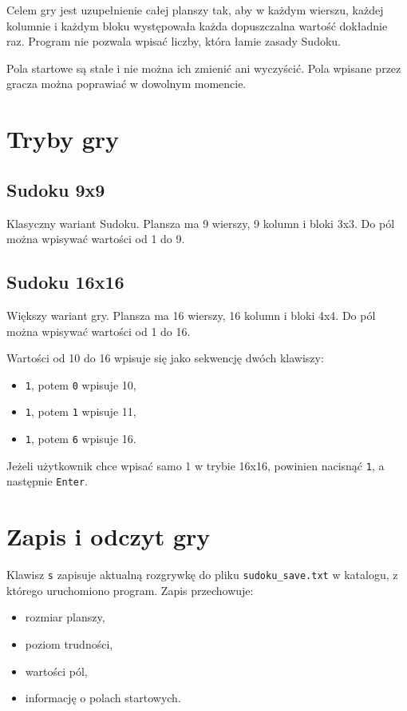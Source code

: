 \documentclass[12pt,a4paper]{article}
\begin{document}
Celem gry jest uzupełnienie całej planszy tak, aby w każdym wierszu, każdej
kolumnie i każdym bloku występowała każda dopuszczalna wartość dokładnie raz.
Program nie pozwala wpisać liczby, która łamie zasady Sudoku.

Pola startowe są stałe i nie można ich zmienić ani wyczyścić. Pola wpisane przez
gracza można poprawiać w dowolnym momencie.

\section{Tryby gry}

\subsection{Sudoku 9x9}

Klasyczny wariant Sudoku. Plansza ma 9 wierszy, 9 kolumn i bloki 3x3. Do pól
można wpisywać wartości od 1 do 9.

\subsection{Sudoku 16x16}

Większy wariant gry. Plansza ma 16 wierszy, 16 kolumn i bloki 4x4. Do pól można
wpisywać wartości od 1 do 16.

Wartości od 10 do 16 wpisuje się jako sekwencję dwóch klawiszy:
\begin{itemize}[noitemsep]
    \item \texttt{1}, potem \texttt{0} wpisuje 10,
    \item \texttt{1}, potem \texttt{1} wpisuje 11,
    \item \texttt{1}, potem \texttt{6} wpisuje 16.
\end{itemize}

Jeżeli użytkownik chce wpisać samo 1 w trybie 16x16, powinien nacisnąć
\texttt{1}, a następnie \texttt{Enter}.

\section{Zapis i odczyt gry}

Klawisz \texttt{s} zapisuje aktualną rozgrywkę do pliku
\texttt{sudoku\_save.txt} w katalogu, z którego uruchomiono program. Zapis
przechowuje:

\begin{itemize}[noitemsep]
    \item rozmiar planszy,
    \item poziom trudności,
    \item wartości pól,
    \item informację o polach startowych.
\end{itemize}
\end{document}
